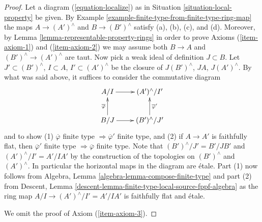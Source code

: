 \documentclass{stacks-project}
\theoremstyle{plain}
\theoremstyle{definition}
\theoremstyle{remark}
\numberwithin{equation}{subsection}
\begin{document}
\begin{proof}
\medskip\noindent
Let a diagram (\ref{equation-localize}) as in
Situation \ref{situation-local-property}
be given. By Example \ref{example-finite-type-from-finite-type-ring-map}
the maps $A \to (A')^\wedge$ and $B \to (B')^\wedge$
satisfy (a), (b), (c), and (d). Moreover, by
Lemma \ref{lemma-representable-property-rings}
in order to prove Axioms (\ref{item-axiom-1}) and (\ref{item-axiom-2})
we may assume both $B \to A$ and $(B')^\wedge \to (A')^\wedge$
are taut. Now pick a weak ideal of definition $J \subset B$. Let
$J' \subset (B')^\wedge$, $I \subset A$, $I' \subset (A')^\wedge$
be the closure of $J(B')^\wedge$, $JA$, $J(A')^\wedge$.
By what was said above, it suffices to consider the commutative
diagram
$$
\xymatrix{
A/I \ar[r] & (A')^\wedge/I' \\
B/J \ar[r] \ar[u]^{\overline{\varphi}} &
(B')^\wedge/J' \ar[u]_{\overline{\varphi}'}
}
$$
and to show (1) $\overline{\varphi}$ finite type
$\Rightarrow \overline{\varphi}'$
finite type, and (2) if $A \to A'$ is faithfully flat, then
$\overline{\varphi}'$ finite type $\Rightarrow \overline{\varphi}$
finite type. Note that $(B')^\wedge/J' = B'/JB'$ and
$(A')^\wedge/I' = A'/IA'$ by the construction of the topologies on
$(B')^\wedge$ and $(A')^\wedge$. In particular the horizontal
maps in the diagram are \'etale. Part (1) now follows from
Algebra, Lemma \ref{algebra-lemma-compose-finite-type}
and part (2) from
Descent, Lemma \ref{descent-lemma-finite-type-local-source-fppf-algebra}
as the ring map $A/I \to (A')^\wedge/I' = A'/IA'$ is faithfully flat
and \'etale.

\medskip\noindent
We omit the proof of Axiom (\ref{item-axiom-3}).
\end{proof}
\end{document}
